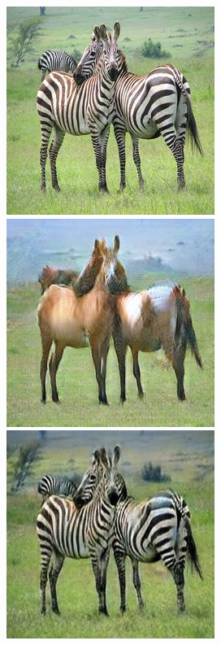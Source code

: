 \documentclass[12pt, fleqn, titlepage]{article}
\newcommand\skipper{1.4pt}
\newcommand\skipperer{0.45pt}
\begin{document}
\begin{figure}[H]
\begin{subfigure}[b]{0.8\textwidth}
		\hskip\skipper
		\includegraphics[width=0.15\linewidth]{imgs/horse2zebra_cycle/gaussnoise/b-a/51_real_a}
		\hskip\skipperer
		\includegraphics[width=0.15\linewidth]{imgs/horse2zebra_cycle/gaussnoise/b-a/51_fake_b}
		\hskip\skipperer
		\includegraphics[width=0.15\linewidth]{imgs/horse2zebra_cycle/gaussnoise/b-a/51_fake_a}
	\end{subfigure}
\end{figure}
\end{document}
